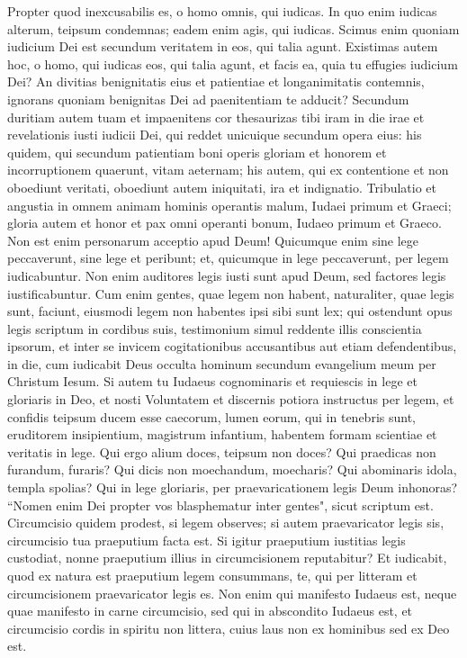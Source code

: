 \begin{biblechapter}  
\verse Propter quod inexcusabilis es, o homo omnis, qui iudicas. In quo enim iudicas alterum, teipsum condemnas; eadem enim agis, qui iudicas. 
\verse Scimus enim quoniam iudicium Dei est secundum veritatem in eos, qui talia agunt. 
\verse Existimas autem hoc, o homo, qui iudicas eos, qui talia agunt, et facis ea, quia tu effugies iudicium Dei? 
\verse An divitias benignitatis eius et patientiae et longanimitatis contemnis, ignorans quoniam benignitas Dei ad paenitentiam te adducit? 
\verse Secundum duritiam autem tuam et impaenitens cor thesaurizas tibi iram in die irae et revelationis iusti iudicii Dei, 
\verse qui reddet unicuique secundum opera eius: 
\verse his quidem, qui secundum patientiam boni operis gloriam et honorem et incorruptionem quaerunt, vitam aeternam; 
\verse his autem, qui ex contentione et non oboediunt veritati, oboediunt autem iniquitati, ira et indignatio. 
\verse Tribulatio et angustia in omnem animam hominis operantis malum, Iudaei primum et Graeci; 
\verse gloria autem et honor et pax omni operanti bonum, Iudaeo primum et Graeco. 
\verse Non est enim personarum acceptio apud Deum! 
\verse Quicumque enim sine lege peccaverunt, sine lege et peribunt; et, quicumque in lege peccaverunt, per legem iudicabuntur. 
\verse Non enim auditores legis iusti sunt apud Deum, sed factores legis iustificabuntur. 
\verse Cum enim gentes, quae legem non habent, naturaliter, quae legis sunt, faciunt, eiusmodi legem non habentes ipsi sibi sunt lex; 
\verse qui ostendunt opus legis scriptum in cordibus suis, testimonium simul reddente illis conscientia ipsorum, et inter se invicem cogitationibus accusantibus aut etiam defendentibus, 
\verse in die, cum iudicabit Deus occulta hominum secundum evangelium meum per Christum Iesum.  
\verse Si autem tu Iudaeus cognominaris et requiescis in lege et gloriaris in Deo,  
\verse et nosti Voluntatem et discernis potiora instructus per legem, 
\verse et confidis teipsum ducem esse caecorum, lumen eorum, qui in tenebris sunt, 
\verse eruditorem insipientium, magistrum infantium, habentem formam scientiae et veritatis in lege. 
\verse Qui ergo alium doces, teipsum non doces? Qui praedicas non furandum, furaris? 
\verse Qui dicis non moechandum, moecharis? Qui abominaris idola, templa spolias? 
\verse Qui in lege gloriaris, per praevaricationem legis Deum inhonoras? 
\verse “Nomen enim Dei propter vos blasphematur inter gentes", sicut scriptum est. 
\verse Circumcisio quidem prodest, si legem observes; si autem praevaricator legis sis, circumcisio tua praeputium facta est. 
\verse Si igitur praeputium iustitias legis custodiat, nonne praeputium illius in circumcisionem reputabitur? 
\verse Et iudicabit, quod ex natura est praeputium legem consummans, te, qui per litteram et circumcisionem praevaricator legis es. 
\verse Non enim qui manifesto Iudaeus est, neque quae manifesto in carne circumcisio, 
\verse sed qui in abscondito Iudaeus est, et circumcisio cordis in spiritu non littera, cuius laus non ex hominibus sed ex Deo est. 
\end{biblechapter}

